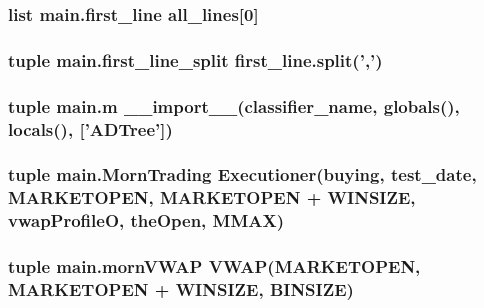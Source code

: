 \hypertarget{namespacemain_ab5cb346125304206e92de6618c43315e}{
\subsubsection[{first\-\_\-line}]{\setlength{\rightskip}{0pt plus 5cm}list main.\-first\-\_\-line {\bf all\-\_\-lines}\mbox{[}0\mbox{]}}}\label{namespacemain_ab5cb346125304206e92de6618c43315e}
\hypertarget{namespacemain_a5d8df8cfa1e45c747b56adcb04a6cc16}{
\subsubsection[{first\-\_\-line\-\_\-split}]{\setlength{\rightskip}{0pt plus 5cm}tuple main.\-first\-\_\-line\-\_\-split first\-\_\-line.\-split(',')}}\label{namespacemain_a5d8df8cfa1e45c747b56adcb04a6cc16}
\hypertarget{namespacemain_adbc6b6d451e5853c258a6713144bae5a}{
\subsubsection[{m}]{\setlength{\rightskip}{0pt plus 5cm}tuple main.\-m \-\_\-\-\_\-import\-\_\-\-\_\-({\bf classifier\-\_\-name}, globals(), locals(), \mbox{[}'{\bf A\-D\-Tree}'\mbox{]})}}\label{namespacemain_adbc6b6d451e5853c258a6713144bae5a}
\hypertarget{namespacemain_ad5e5023cc95c9e2c194d60e014d06a70}{
\subsubsection[{Morn\-Trading}]{\setlength{\rightskip}{0pt plus 5cm}tuple main.\-Morn\-Trading {\bf Executioner}({\bf buying}, test\-\_\-date, M\-A\-R\-K\-E\-T\-O\-P\-E\-N, M\-A\-R\-K\-E\-T\-O\-P\-E\-N + W\-I\-N\-S\-I\-Z\-E, {\bf vwap\-Profile\-O}, {\bf the\-Open}, M\-M\-A\-X)}}\label{namespacemain_ad5e5023cc95c9e2c194d60e014d06a70}
\hypertarget{namespacemain_a11be7005c54d47daa509fba406aac63e}{
\subsubsection[{morn\-V\-W\-A\-P}]{\setlength{\rightskip}{0pt plus 5cm}tuple main.\-morn\-V\-W\-A\-P {\bf V\-W\-A\-P}(M\-A\-R\-K\-E\-T\-O\-P\-E\-N, M\-A\-R\-K\-E\-T\-O\-P\-E\-N + W\-I\-N\-S\-I\-Z\-E, B\-I\-N\-S\-I\-Z\-E)}}\label{namespacemain_a11be7005c54d47daa509fba406aac63e}
